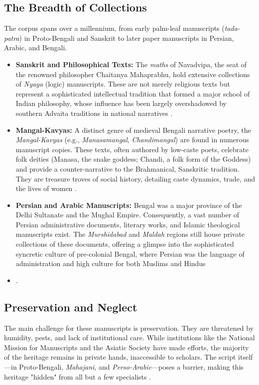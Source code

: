 \documentclass{article}
\begin{document}
\subsection{The Breadth of Collections}
The corpus spans over a millennium, from early palm-leaf manuscripts (\textit{tada-patra}) in Proto-Bengali and Sanskrit to later paper manuscripts in Persian, Arabic, and Bengali.
\begin{itemize}
    \item \textbf{Sanskrit and Philosophical Texts:} The \textit{maths} of Navadvipa, the seat of the renowned philosopher Chaitanya Mahaprabhu, hold extensive collections of \textit{Nyaya} (logic) manuscripts. These are not merely religious texts but represent a sophisticated intellectual tradition that formed a major school of Indian philosophy, whose influence has been largely overshadowed by southern Advaita traditions in national narratives \cite{bhattacharya2018}.
    \item \textbf{Mangal-Kavyas:} A distinct genre of medieval Bengali narrative poetry, the \textit{Mangal-Kavyas} (e.g., \textit{Manasamangal}, \textit{Chandimangal}) are found in numerous manuscript copies. These texts, often authored by low-caste poets, celebrate folk deities (Manasa, the snake goddess; Chandi, a folk form of the Goddess) and provide a counter-narrative to the Brahmanical, Sanskritic tradition. They are treasure troves of social history, detailing caste dynamics, trade, and the lives of women \cite{sen1997}.
    \item \textbf{Persian and Arabic Manuscripts:} Bengal was a major province of the Delhi Sultanate and the Mughal Empire. Consequently, a vast number of Persian administrative documents, literary works, and Islamic theological manuscripts exist. The \textit{Murshidabad} and \textit{Maldah} regions still house private collections of these documents, offering a glimpse into the sophisticated syncretic culture of pre-colonial Bengal, where Persian was the language of administration and high culture for both Muslims and Hindus \item \cite{dasgupta2019}.
\end{itemize}

\subsection{Preservation and Neglect}
The main challenge for these manuscripts is preservation. They are threatened by humidity, pests, and lack of institutional care. While institutions like the National Mission for Manuscripts and the Asiatic Society have made efforts, the majority of the heritage remains in private hands, inaccessible to scholars. The script itself—in Proto-Bengali, \textit{Mahajani}, and \textit{Perso-Arabic}—poses a barrier, making this heritage "hidden" from all but a few specialists \cite{acharya2014}.
\end{document}
